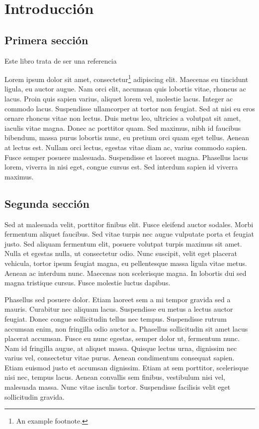 \chapter{Introducción}
\section{Primera sección}
Este libro trata de ser una referencia



Lorem ipsum dolor sit amet, consectetur\footnote{An example footnote.} adipiscing elit. Maecenas eu tincidunt ligula, eu auctor augue. Nam orci elit, accumsan quis lobortis vitae, rhoncus ac lacus. Proin quis sapien varius, aliquet lorem vel, molestie lacus. Integer ac commodo lacus. Suspendisse ullamcorper at tortor non feugiat. Sed at nisi eu eros ornare rhoncus vitae non lectus. Duis metus leo, ultricies a volutpat sit amet, iaculis vitae magna. Donec ac porttitor quam. Sed maximus, nibh id faucibus bibendum, massa purus lobortis nunc, eu pretium orci quam eget tellus. Aenean at lectus est. Nullam orci lectus, egestas vitae diam ac, varius commodo sapien. Fusce semper posuere malesuada. Suspendisse et laoreet magna. Phasellus lacus lorem, viverra in nisi eget, congue cursus est. Sed interdum sapien id viverra maximus.


\section{Segunda sección}
Sed at malesuada velit, porttitor finibus elit. Fusce eleifend auctor sodales. Morbi fermentum aliquet faucibus. Sed vitae turpis nec augue vulputate porta et feugiat justo. Sed aliquam fermentum elit, posuere volutpat turpis maximus sit amet. Nulla et egestas nulla, ut consectetur odio. Nunc suscipit, velit eget placerat vehicula, tortor ipsum feugiat magna, eu pellentesque massa ligula vitae metus. Aenean ac interdum nunc. Maecenas non scelerisque magna. In lobortis dui sed magna tristique cursus. Fusce molestie luctus dapibus.

Phasellus sed posuere dolor. Etiam laoreet sem a mi tempor gravida sed a mauris. Curabitur nec aliquam lacus. Suspendisse eu metus a lectus auctor feugiat. Donec congue sollicitudin tellus nec tempus. Suspendisse rutrum accumsan enim, non fringilla odio auctor a. Phasellus sollicitudin sit amet lacus placerat accumsan. Fusce eu nunc egestas, semper dolor ut, fermentum nunc. Nam id fringilla augue, at aliquet massa. Quisque lectus urna, dignissim nec varius vel, consectetur vitae purus. Aenean condimentum consequat sapien. Etiam euismod justo et accumsan dignissim. Etiam at sem porttitor, scelerisque nisi nec, tempus lacus. Aenean convallis sem finibus, vestibulum nisi vel, malesuada massa. Nunc vitae iaculis tortor. Suspendisse facilisis velit eget sollicitudin gravida.

